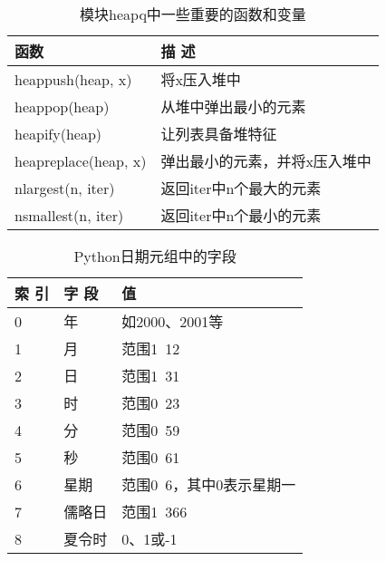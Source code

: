 \begin{table}
    \centering
    \caption{模块heapq中一些重要的函数和变量}
    \label{heapq}
    \begin{tabular}{ll}
        \hline
        函数                   & 描 述             \\
        \hline
        heappush(heap, x)    & 将x压入堆中          \\
        heappop(heap)        & 从堆中弹出最小的元素      \\
        heapify(heap)        & 让列表具备堆特征        \\
        heapreplace(heap, x) & 弹出最小的元素，并将x压入堆中 \\
        nlargest(n, iter)    & 返回iter中n个最大的元素  \\
        nsmallest(n, iter)   & 返回iter中n个最小的元素  \\
        \hline
    \end{tabular}
\end{table}

\begin{table}
    \centering
    \caption{Python日期元组中的字段}
    \label{timePython}
    \begin{tabular}{lll}
        \hline
        索 引 & 字 段 & 值              \\
        \hline
        0   & 年   & 如2000、2001等    \\
        1   & 月   & 范围1~12         \\
        2   & 日   & 范围1~31         \\
        3   & 时   & 范围0~23         \\
        4   & 分   & 范围0~59         \\
        5   & 秒   & 范围0~61         \\
        6   & 星期  & 范围0~6，其中0表示星期一 \\
        7   & 儒略日 & 范围1~366        \\
        8   & 夏令时 & 0、1或-1         \\
        \hline
    \end{tabular}
\end{table}

